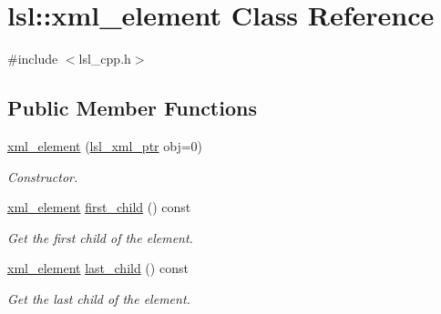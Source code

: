 \hypertarget{classlsl_1_1xml__element}{}\section{lsl\+:\+:xml\+\_\+element Class Reference}
\label{classlsl_1_1xml__element}


{\ttfamily \#include $<$lsl\+\_\+cpp.\+h$>$}

\subsection*{Public Member Functions}
\begin{DoxyCompactItemize}
\item 
\mbox{\label{classlsl_1_1xml__element_a9a2c940a06714662f3cef5e9847e8cae}} 
\hyperlink{classlsl_1_1xml__element_a9a2c940a06714662f3cef5e9847e8cae}{xml\+\_\+element} (\hyperlink{namespacelsl_a5edc7a49a1a1be1634fe6dce3d59c59b}{lsl\+\_\+xml\+\_\+ptr} obj=0)
\begin{DoxyCompactList}\small\item\em Constructor. \end{DoxyCompactList}\item 
\mbox{\label{classlsl_1_1xml__element_ab68b7a1c63c2cb0eb4ce6361b94469b7}} 
\hyperlink{classlsl_1_1xml__element}{xml\+\_\+element} \hyperlink{classlsl_1_1xml__element_ab68b7a1c63c2cb0eb4ce6361b94469b7}{first\+\_\+child} () const
\begin{DoxyCompactList}\small\item\em Get the first child of the element. \end{DoxyCompactList}\item 
\mbox{\label{classlsl_1_1xml__element_a12254f735a79a11b75718fe7c28186d0}} 
\hyperlink{classlsl_1_1xml__element}{xml\+\_\+element} \hyperlink{classlsl_1_1xml__element_a12254f735a79a11b75718fe7c28186d0}{last\+\_\+child} () const
\begin{DoxyCompactList}\small\item\em Get the last child of the element. \end{DoxyCompactList}\item 
\mbox{\label{classlsl_1_1xml__element_a9637215f616b660789696e452b0e0591}} 

\end{DoxyCompactItemize}
